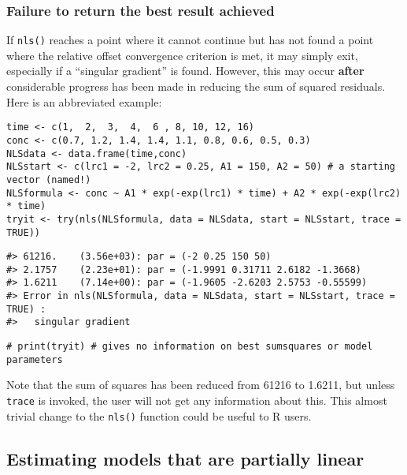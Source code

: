 \hypertarget{failure-to-return-the-best-result-achieved}{%
\subsubsection{Failure to return the best result achieved}\label{failure-to-return-the-best-result-achieved}}

If \texttt{nls()} reaches a point where it cannot continue but has not found a point
where the relative offset convergence criterion is met, it may simply exit,
especially if a ``singular gradient'' is found. However,
this may occur \textbf{after} considerable progress has been made in reducing
the sum of squared residuals.
Here is an abbreviated example:

\begin{verbatim}
time <- c(1,  2,  3,  4,  6 , 8, 10, 12, 16)
conc <- c(0.7, 1.2, 1.4, 1.4, 1.1, 0.8, 0.6, 0.5, 0.3)
NLSdata <- data.frame(time,conc)
NLSstart <- c(lrc1 = -2, lrc2 = 0.25, A1 = 150, A2 = 50) # a starting vector (named!)
NLSformula <- conc ~ A1 * exp(-exp(lrc1) * time) + A2 * exp(-exp(lrc2) * time)
tryit <- try(nls(NLSformula, data = NLSdata, start = NLSstart, trace = TRUE))
\end{verbatim}

\begin{verbatim}
#> 61216.    (3.56e+03): par = (-2 0.25 150 50)
#> 2.1757    (2.23e+01): par = (-1.9991 0.31711 2.6182 -1.3668)
#> 1.6211    (7.14e+00): par = (-1.9605 -2.6203 2.5753 -0.55599)
#> Error in nls(NLSformula, data = NLSdata, start = NLSstart, trace = TRUE) : 
#>   singular gradient
\end{verbatim}

\begin{verbatim}
# print(tryit) # gives no information on best sumsquares or model parameters
\end{verbatim}

Note that the sum of squares has been reduced from 61216 to 1.6211, but
unless \texttt{trace} is invoked, the user will not get any information about this.
This almost trivial change to the \texttt{nls()} function could be
useful to R users.

\hypertarget{estimating-models-that-are-partially-linear}{%
\subsection{Estimating models that are partially linear}\label{estimating-models-that-are-partially-linear}}

